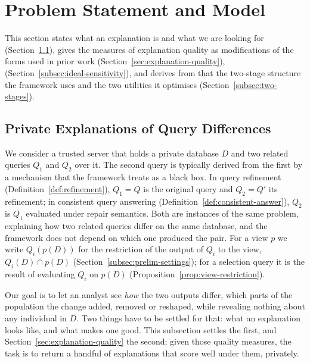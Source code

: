 
\section{Problem Statement and Model}\label{sec:model}
This section states what an explanation is and what we are looking for (Section~\ref{subsec:private-query-difference-setting}), gives the measures of explanation quality as modifications of the forms used in prior work (Section~\ref{sec:explanation-quality}),  (Section~\ref{subsec:ideal-sensitivity}), and derives from that the two-stage structure the framework uses and the two utilities it optimises (Section~\ref{subsec:two-stages}).

\subsection{Private Explanations of Query Differences}
\label{subsec:private-query-difference-setting}

We consider a trusted server that holds a private database $D$ and two related queries $Q_1$ and $Q_2$ over it.
The second query is typically derived from the first by a mechanism that the framework treats as a black box.
In query refinement (Definition~\ref{def:refinement}), $Q_1=Q$ is the original query and $Q_2=Q'$ its refinement; in consistent query answering (Definition~\ref{def:consistent-answer}), $Q_2$ is $Q_1$ evaluated under repair semantics.
Both are instances of the same problem, explaining how two related queries differ on the same database, and the framework does not depend on which one produced the pair.
For a view $p$ we write $Q_i(p(D))$ for the restriction of the output of $Q_i$ to the view, $Q_i(D)\cap p(D)$ (Section~\ref{subsec:prelim-settings}); for a selection query it is the result of evaluating $Q_i$ on $p(D)$ (Proposition~\ref{prop:view-restriction}).

Our goal is to let an analyst see \emph{how} the two outputs differ, which parts of the population the change added, removed or reshaped, while revealing nothing about any individual in $D$.
Two things have to be settled for that: what an explanation looks like, and what makes one good.
This subsection settles the first, and Section~\ref{sec:explanation-quality} the second; given those quality measures, the task is to return a handful of explanations that score well under them, privately.

